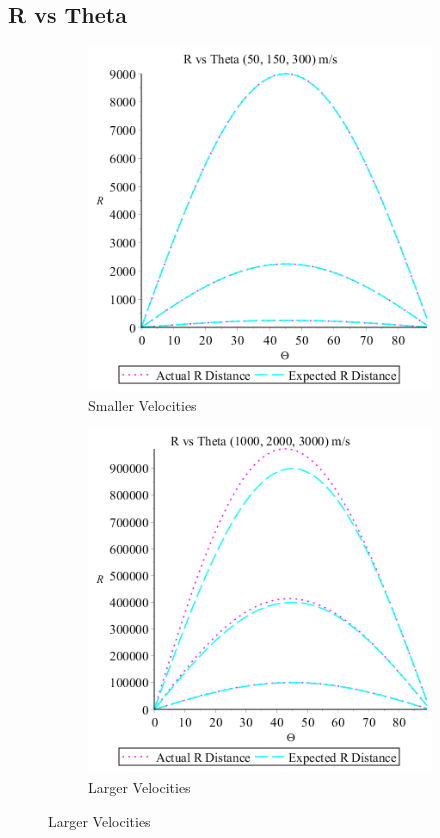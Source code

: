 \documentclass[12pt]{extarticle}
\begin{document}
\subsection{R vs Theta}
\begin{figure}[h!]
	\caption{R vs Theta}
	\begin{subfigure}{0.50\textwidth}
		\includegraphics[width=0.8\linewidth]{RvsTheta1.png}
		\caption{Smaller Velocities}
		\label{fig:img5}
	\end{subfigure}
	\begin{subfigure}{0.50\textwidth}
		\includegraphics[width=0.8\linewidth]{RvsTheta2.png}
		\caption{Larger Velocities}
		\label{fig:img6}
	\end{subfigure}
	
\end{figure}
\end{document}
